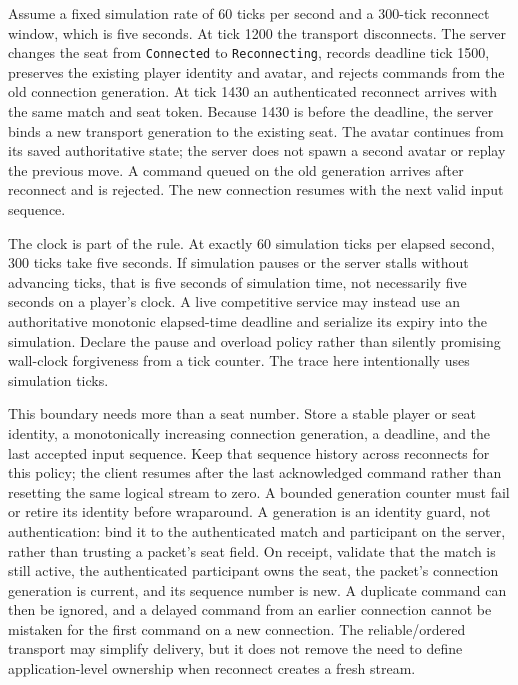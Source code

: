 Assume a fixed simulation rate of 60 ticks per second and a 300-tick reconnect window, which is five seconds. At tick 1200 the transport disconnects. The server changes the seat from \texttt{Connected} to \texttt{Reconnecting}, records deadline tick 1500, preserves the existing player identity and avatar, and rejects commands from the old connection generation. At tick 1430 an authenticated reconnect arrives with the same match and seat token. Because 1430 is before the deadline, the server binds a new transport generation to the existing seat. The avatar continues from its saved authoritative state; the server does not spawn a second avatar or replay the previous move. A command queued on the old generation arrives after reconnect and is rejected. The new connection resumes with the next valid input sequence.

The clock is part of the rule. At exactly 60 simulation ticks per elapsed second, 300 ticks take five seconds. If simulation pauses or the server stalls without advancing ticks, that is five seconds of simulation time, not necessarily five seconds on a player's clock. A live competitive service may instead use an authoritative monotonic elapsed-time deadline and serialize its expiry into the simulation. Declare the pause and overload policy rather than silently promising wall-clock forgiveness from a tick counter. The trace here intentionally uses simulation ticks.

This boundary needs more than a seat number. Store a stable player or seat identity, a monotonically increasing connection generation, a deadline, and the last accepted input sequence. Keep that sequence history across reconnects for this policy; the client resumes after the last acknowledged command rather than resetting the same logical stream to zero. A bounded generation counter must fail or retire its identity before wraparound. A generation is an identity guard, not authentication: bind it to the authenticated match and participant on the server, rather than trusting a packet's seat field. On receipt, validate that the match is still active, the authenticated participant owns the seat, the packet's connection generation is current, and its sequence number is new. A duplicate command can then be ignored, and a delayed command from an earlier connection cannot be mistaken for the first command on a new connection. The reliable/ordered transport may simplify delivery, but it does not remove the need to define application-level ownership when reconnect creates a fresh stream.

